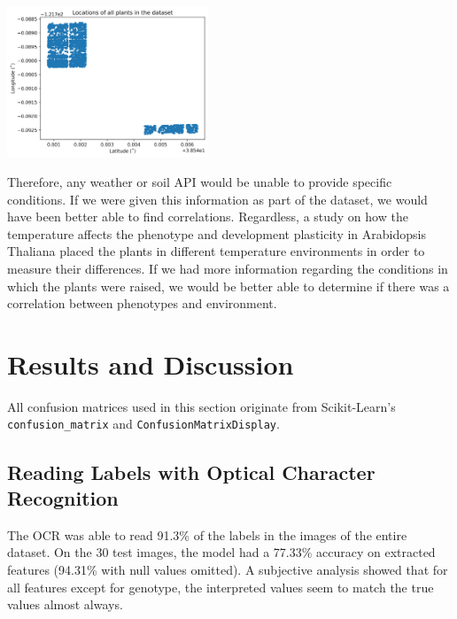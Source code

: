\documentclass[final,5p,times,twocolumn,authoryear]{elsarticle}
\begin{document}
\begin{center}
    \includegraphics[width=0.45\textwidth]{images/plant_locs.png}
\end{center}

Therefore, any weather or soil API would be unable to provide specific conditions. If we were given this information as part of the dataset, we would have been better able to find correlations. Regardless, a study on how the temperature affects the phenotype and development plasticity in Arabidopsis Thaliana \citep{ibanez2017ambient} placed the plants in different temperature environments in order to measure their differences. If we had more information regarding the conditions in which the plants were raised, we would be better able to determine if there was a correlation between phenotypes and environment.


\section{Results and Discussion}
\label{results}

All confusion matrices used in this section originate from Scikit-Learn's \verb|confusion_matrix| and \verb|ConfusionMatrixDisplay|.

\subsection{Reading Labels with Optical Character Recognition}
\label{step_1}

The OCR was able to read 91.3\% of the labels in the images of the entire dataset. On the 30 test images, the model had a 77.33\% accuracy on extracted features (94.31\% with null values omitted). A subjective analysis showed that for all features except for genotype, the interpreted values seem to match the true values almost always.
\end{document}

